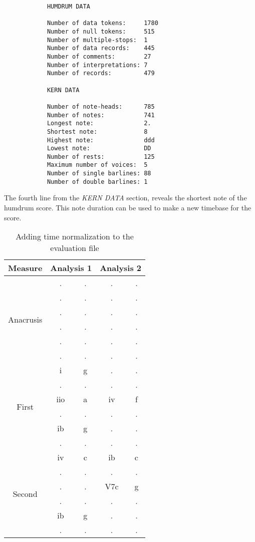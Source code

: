 		\begin{verbatim}
			HUMDRUM DATA

			Number of data tokens:     1780
			Number of null tokens:     515
			Number of multiple-stops:  1
			Number of data records:    445
			Number of comments:        27
			Number of interpretations: 7
			Number of records:         479

			KERN DATA

			Number of note-heads:      785
			Number of notes:           741
			Longest note:              2.
			Shortest note:             8
			Highest note:              ddd
			Lowest note:               DD
			Number of rests:           125
			Maximum number of voices:  5
			Number of single barlines: 88
			Number of double barlines: 1

		\end{verbatim}

	The fourth line from the \emph{KERN DATA} section, reveals the shortest note of the humdrum score. This note duration can be used to make a new timebase for the score.

	\begin{table}[tbp]
	\centering
	\begin{tabular}{|c|c|c|c|c|}
	\hline
	Measure & \multicolumn{2}{c|}{Analysis 1} & \multicolumn{2}{c|}{Analysis 2} \\ \hline
	\multirow{6}{*}{Anacrusis} & . & . & . & . \\ \cline{2-5}
	 & . & . & . & . \\ \cline{2-5}
	 & . & . & . & . \\ \cline{2-5}
	 & . & . & . & . \\ \cline{2-5}
	 & . & . & . & . \\ \cline{2-5}
	 & . & . & . & . \\ \hline
	\multirow{6}{*}{First} & i & g & . & . \\ \cline{2-5}
	 & . & . & . & . \\ \cline{2-5}
	 & iio & a & iv & f \\ \cline{2-5}
	 & . & . & . & . \\ \cline{2-5}
	 & ib & g & . & . \\ \cline{2-5}
	 & . & . & . & . \\ \hline
	\multirow{6}{*}{Second} & iv & c & ib & c \\ \cline{2-5}
	 & . & . & . & . \\ \cline{2-5}
	 & . & . & V7c & g \\ \cline{2-5}
	 & . & . & . & . \\ \cline{2-5}
	 & ib & g & . & . \\ \cline{2-5}
	 & . & . & . & . \\ \hline
	\end{tabular}
	\caption{Adding time normalization to the evaluation file}
	\label{table:normalization}
	\end{table}

